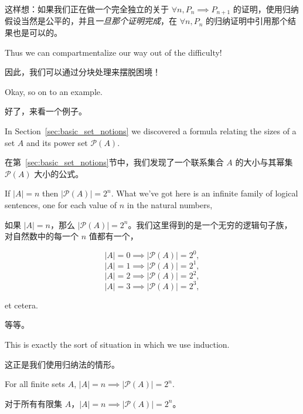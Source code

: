 这样想：如果我们正在做一个完全独立的关于 $\forall n,  P_n \implies P_{n+1}$ 的证明，使用归纳假设当然是公平的，并且\emph{一旦那个证明完成}，在 $\forall n,  P_n$ 的归纳证明中引用那个结果也是可以的。

Thus we can compartmentalize our way out of the
difficulty!

因此，我们可以通过分块处理来摆脱困境！

Okay, so on to an example.

好了，来看一个例子。

In Section~\ref{sec:basic_set_notions} 
we discovered a formula relating the sizes of a set $A$ and its 
power set ${\mathcal P}(A)$.

在第~\ref{sec:basic_set_notions}节中，我们发现了一个联系集合 $A$ 的大小与其幂集 ${\mathcal P}(A)$ 大小的公式。

If $|A| = n$ then $|{\mathcal P}(A)| = 2^n$.
What we've got here is an infinite family of logical sentences, one for 
each value of $n$ in the natural numbers,

如果 $|A| = n$，那么 $|{\mathcal P}(A)| = 2^n$。我们这里得到的是一个无穷的逻辑句子族，对自然数中的每一个 $n$ 值都有一个，

\[ |A| = 0 \implies |{\mathcal P}(A)| = 2^0, \]
\[ |A| = 1 \implies |{\mathcal P}(A)| = 2^1, \]
\[ |A| = 2 \implies |{\mathcal P}(A)| = 2^2, \]
\[ |A| = 3 \implies |{\mathcal P}(A)| = 2^3, \]

\noindent et cetera.

\noindent 等等。

This is exactly the sort of situation in which we use induction.

这正是我们使用归纳法的情形。

\begin{thm} For all finite sets $A$, $\displaystyle |A| = n \implies  |{\mathcal P}(A)| = 2^n$.

对于所有有限集 $A$，$\displaystyle |A| = n \implies  |{\mathcal P}(A)| = 2^n$。
\end{thm}

